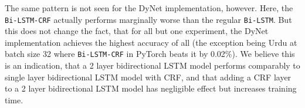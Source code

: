 The same pattern is not seen for the DyNet implementation, however. Here, the
\texttt{Bi-LSTM-CRF} actually performs marginally worse than the regular
\texttt{Bi-LSTM}. But this does not change the fact, that for all but one
experiment, the DyNet implementation achieves the highest accuracy of all (the
exception being Urdu at batch size 32 where \texttt{Bi-LSTM-CRF} in PyTorch
beats it by 0.02\%). We believe this is an indication, that a 2 layer
bidirectional LSTM model performs comparably to single layer bidirectional LSTM
model with CRF, and that adding a CRF layer to a 2 layer bidirectional LSTM
model has negligible effect but increases training time.

\pagebreak

